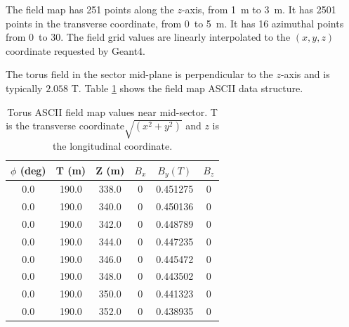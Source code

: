 The field map has 251 points along the $z$-axis, from 1~m to 3~m. It has 2501 points in the transverse coordinate, from 0~to 5~m.
It has 16 azimuthal points from 0\mdeg \ to 30\mdeg. The field grid values are linearly interpolated to the $(x,y,z)$
coordinate requested by Geant4.

The torus field in the sector mid-plane is perpendicular to the $z$-axis and is typically $2.058$ T.
Table \ref{tab:torMap} shows the field map ASCII data structure.

\begin{table}[h]
	\begin{center}
		\begin{tabular}{| c | c | c | c | c | c | }
		 \hline \hline
         $\phi$ (deg) & T (m)    & Z (m)    &  $B_x$  &    $B_y (T)$    & $B_z$\\
			\hline
          0.0         &  190.0   &  338.0   &  0       &     0.451275 &  0 \\
          0.0         &  190.0   &  340.0   &  0       &     0.450136 &  0 \\
          0.0         &  190.0   &  342.0   &  0       &     0.448789 &  0 \\
          0.0         &  190.0   &  344.0   &  0       &     0.447235 &  0 \\
          0.0         &  190.0   &  346.0   &  0       &     0.445472 &  0 \\
          0.0         &  190.0   &  348.0   &  0       &     0.443502 &  0 \\
          0.0         &  190.0   &  350.0   &  0       &     0.441323 &  0 \\
          0.0         &  190.0   &  352.0   &  0       &     0.438935 &  0 \\
		\hline \hline
		\end{tabular}
	\end{center}
	\caption{Torus ASCII field map values near mid-sector. T is the transverse coordinate$\sqrt{(x^2+y^2)}$ and
             $z$ is the longitudinal coordinate.}
 	\label{tab:torMap}
\end{table}


